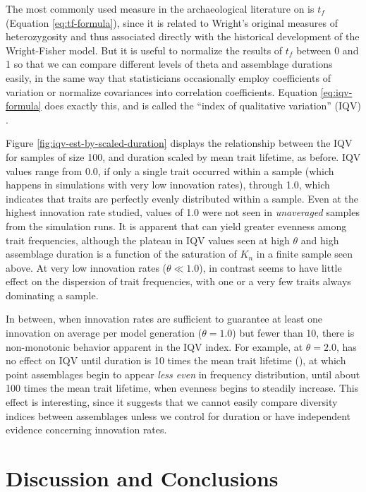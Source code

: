 The most commonly used measure in the archaeological literature on \ct is $t_f$ (Equation \ref{eq:tf-formula}), since it is related to Wright's original measures of heterozygosity and thus associated directly with the historical development of the Wright-Fisher model.  But it is useful to normalize the results of $t_f$ between 0 and 1 so that we can compare different levels of theta and assemblage durations easily, in the same way that statisticians occasionally employ coefficients of variation or normalize covariances into correlation coefficients.  Equation \ref{eq:iqv-formula} does exactly this, and is called the ``index of qualitative variation'' (IQV) \citep{wilcox1973indices}.

Figure \ref{fig:iqv-est-by-scaled-duration} displays the relationship between the IQV for samples of size 100, and \timeav duration scaled by mean trait lifetime, as before.  IQV values range from 0.0, if only a single trait occurred within a sample (which happens in simulations with very low innovation rates), through 1.0, which indicates that traits are perfectly evenly distributed within a sample.  Even at the highest innovation rate studied, values of 1.0 were not seen in \emph{unaveraged} samples from the simulation runs.  It is apparent that \timeav can yield greater evenness among trait frequencies, although the plateau in IQV values  seen at high $\theta$ and high assemblage duration is a function of the saturation of $K_n$ in a finite sample seen above.  At very low innovation rates ($\theta \ll 1.0$), \timeav in contrast seems to have little effect on the dispersion of trait frequencies, with one or a very few traits always dominating a sample.



In between, when innovation rates are sufficient to guarantee at least one innovation on average per model generation ($\theta = 1.0$) but fewer than 10, there is non-monotonic behavior apparent in the IQV index.  For example, at $\theta = 2.0$, \timeav has no effect on IQV until duration is 10 times the mean trait lifetime (\mtl), at which point assemblages begin to appear \emph{less even} in frequency distribution, until about 100 times the mean trait lifetime, when evenness begins to steadily increase.   This effect is interesting, since it suggests that we cannot easily compare diversity indices between assemblages unless we control for duration or have independent evidence concerning innovation rates.   
 

\section{Discussion and Conclusions}
\label{sec:conclusions}

